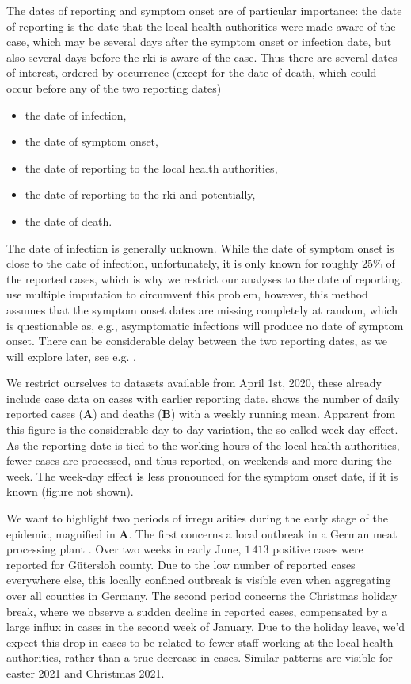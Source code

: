 The dates of reporting and symptom onset are of particular importance: the date of reporting is the date that the local health authorities were made aware of the case, which may be several days after the symptom onset or infection date, but also several days before the \acrshort{rki} is aware of the case. Thus there are several dates of interest, ordered by occurrence (except for the date of death, which could occur before any of the two reporting dates)
\begin{itemize}
    \item the date of infection, 
    \item the date of symptom onset, 
    \item the date of reporting to the local health authorities,
    \item the date of reporting to the \acrshort{rki} and potentially,
    \item the date of death.
\end{itemize}
The date of infection is generally unknown. While the date of symptom onset is close to the date of infection, unfortunately, it is only known for roughly $25\%$ of the reported cases, which is why we restrict our analyses to the date of reporting. \citep{AnDerHeiden2020Schatzung} use multiple imputation to circumvent this problem, however, this method assumes that the symptom onset dates are missing completely at random, which is questionable as, e.g., asymptomatic infections will produce no date of symptom onset. There can be considerable delay between the two reporting dates, as we will explore later, see e.g. .

We restrict ourselves to datasets available from April 1st, 2020, these already include case data on cases with earlier reporting date.  shows the number of daily reported cases (\textbf{A}) and deaths (\textbf{B}) with a weekly running mean. Apparent from this figure is the considerable day-to-day variation, the so-called week-day effect. As the reporting date is tied to the working hours of the local health authorities, fewer cases are processed, and thus reported, on weekends and more during the week. The week-day effect is less pronounced for the symptom onset date, if it is known (figure not shown). 

We want to highlight two periods of irregularities during the early stage of the epidemic, magnified in  \textbf{A}. The first concerns a local outbreak in a German meat processing plant \citep{Gunther2020SARSCoV2}. Over two weeks in early June, $1\,413$ positive cases were reported for Gütersloh county. Due to the low number of reported cases everywhere else, this locally confined outbreak is visible even when aggregating over all counties in Germany. 
The second period concerns the Christmas holiday break, where we observe a sudden decline in reported cases, compensated by a large influx in cases in the second week of January. Due to the holiday leave, we'd expect this drop in cases to be related to fewer staff working at the local health authorities, rather than a true decrease in cases. Similar patterns are visible for easter 2021 and Christmas 2021. 

